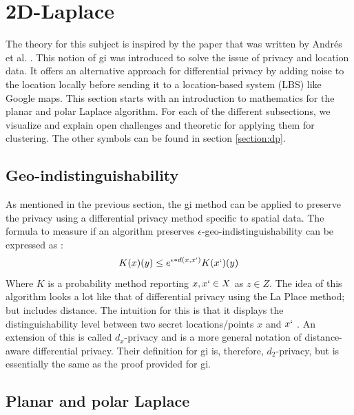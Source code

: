 
\section{2D-Laplace}
The theory for this subject is inspired by the paper that was written by Andrés et al. \citep{DBLP:journals/corr/abs-1212-1984}.
This notion of \gls{gi} was introduced to solve the issue of privacy and location data.
It offers an alternative approach for differential privacy by adding noise to the location locally before sending it to a location-based system (LBS) like Google maps.
This section starts with an introduction to mathematics for the planar and polar Laplace algorithm.
For each of the different subsections, we visualize and explain open challenges and theoretic for applying them for clustering.
\glsaddall
\leading{10pt}
\printglossary[type=genericmath, nonumberlist]
The other symbols can be found in section \ref{section:dp}.
\subsection*{Geo-indistinguishability}
As mentioned in the previous section, the \gls{gi} method can be applied to preserve the privacy using a differential privacy method specific to spatial data.
The formula to measure if an algorithm preserves $\epsilon$-geo-indistinguishability can be expressed as \citep{DBLP:journals/corr/abs-1212-1984}:
\begin{equation}
  K(x)(y) \le e^{\epsilon * d(x,x`)} K(x`)(y)
  \label{algo:2d-geo-indistinguishability}
\end{equation}
Where $K$ is a probability method reporting $x, x` \in X$ as $z \in Z$.
The idea of this algorithm looks a lot like that of differential privacy using the La Place method; but includes distance.
The intuition for this is that it displays the distinguishability level between two secret locations/points $x$ and $x`$ \citep{chatzikokolakis_constructing_2015}.
An extension of this is called $d_x$-privacy and is a more general notation of distance-aware differential privacy.
Their definition for \gls{gi} is, therefore, $d_2$-privacy, but is essentially the same as the proof provided for \gls{gi}.

\subsection{Planar and polar Laplace}
\printglossary[type=2dlaplace]


